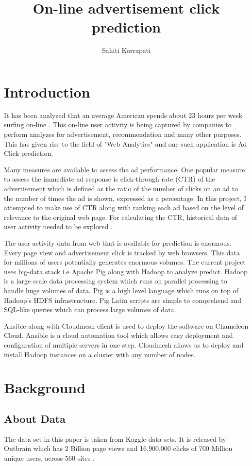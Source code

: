 \documentclass[9pt,twocolumn,twoside]{../../styles/osajnl}
\title{ On-line advertisement click prediction }
\author[1,*]{Sahiti Korrapati}
\affil[1]{School of Informatics and Computing, Bloomington, IN 47408, U.S.A.}
\affil[*]{Corresponding authors: sakorrap@iu.edu, S17-IR-2013}
\begin{document}
\maketitle
\section{Introduction}
It has been analyzed that an average American spends about 23 hours per week surfing on-line \cite{news-social-media}. This on-line user activity is being captured by companies to perform analyzes for advertisement, recommendation and many other purposes. This has given rise to the field of "Web Analytics" and one such application is Ad Click prediction.

Many measures are available to assess the ad performance. One popular measure to assess the immediate ad response is click-through rate (CTR) of the advertisement \cite{dictionary-clickThrough} which is defined as the ratio of the number of clicks on an ad to the number of times the ad is shown, expressed as a percentage. In this project, I attempted to make use of CTR along with ranking each ad based on the level of relevance to the original web page. For calculating the CTR, historical data of user activity needed to be explored \cite{wiki-clickThrough}.

The user activity data from web that is available for prediction is enormous. Every page view and advertisement click is tracked by web browsers. This data for millions of users potentially generates enormous volumes. The current project uses big-data stack i.e Apache Pig along with Hadoop to analyze predict. Hadoop is a large scale data processing system which runs on parallel processing to handle huge volumes of data. Pig is a high level language which runs on top of Hadoop's HDFS infrastructure. Pig Latin scripts are simple to comprehend and SQL-like queries which can process large volumes of data.

Ansible along with Cloudmesh client is used to deploy the software on Chameleon Cloud. Ansible is a cloud automation tool which allows easy deployment and configuration of multiple servers in one step. Cloudmesh allows us to deploy and install Hadoop instances on a cluster with any number of nodes.

\section{Background}
\subsection{About Data}
The data set in this paper is taken from Kaggle data sets. It is released by Outbrain which has 2 Billion page views and 16,900,000 clicks of 700 Million unique users, across 560 sites \cite{kaggle-outbrain}.
\end{document}
